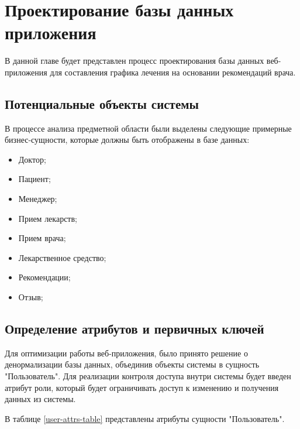 \chapter{Проектирование базы данных приложения}

        В данной главе будет представлен процесс проектирования базы данных %
        веб-приложения для составления графика лечения на основании рекомендаций %
        врача.
        
    \section{Потенциальные объекты системы}
        В процессе анализа предметной области были выделены следующие примерные %
        бизнес-сущности, которые должны быть отображены в базе данных:

        \begin{itemize}
            \item Доктор;
            \item Пациент;
            \item Менеджер;
            \item Прием лекарств;
            \item Прием врача;
            \item Лекарственное средство;
            \item Рекомендации;
            \item Отзыв;
        \end{itemize}

    \section{Определение атрибутов и первичных ключей}

        Для оптимизации работы веб-приложения, было принято решение о %
        денормализации базы данных, объединив объекты системы в сущность "Пользователь". %
        Для реализации контроля доступа внутри системы будет введен атрибут роли, %
        который будет ограничивать доступ к изменению и получения данных из системы. %

        В таблице \ref{user-attrs-table} представлены атрибуты сущности "Пользователь".


